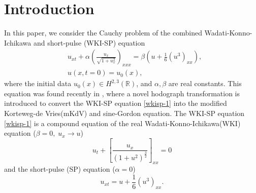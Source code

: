\documentclass[11pt]{article}
\numberwithin{equation}{section}
\begin{document}
\tableofcontents

\section{Introduction}
In this paper, we  consider  the Cauchy problem of the combined Wadati-Konno-Ichikawa and short-pulse (WKI-SP) equation
\begin{align}
    &u_{xt}+\alpha\left(\frac{u_x}{\sqrt{1+u_x^2}}\right)_{xxx}=\beta\left(u+\frac{1}{6}(u^3)_{xx}\right),\label{wkisp-1}\\
    &u(x,t=0)=u_0(x),\label{wkisp-2}
\end{align}
where the initial data $u_0(x)\in H^{2,3}(\mathbb{R})$, and $\alpha, \beta $ are real   constants.
This equation  was  found recently  in \cite{Hu-2024}, where  a novel hodograph transformation is introduced  to convert the   WKI-SP equation  \eqref{wkisp-1} into the modified Korteweg-de Vries(mKdV) and sine-Gordon equation. The WKI-SP equation   \eqref{wkisp-1}  is a compound equation of the real  Wadati-Konno-Ichikawa(WKI) equation ($\beta=0,\;u_x\to u$)
\begin{equation}
    u_t+\left[\frac{u_x}{(1+u^2)^{\frac{3}{2}}}\right]_{xx}=0\label{wki}
\end{equation}
and the short-pulse (SP) equation ($\alpha=0$)
\begin{equation}
    u_{xt}=u+\frac{1}{6}\left(u^3\right)_{xx}.\label{sp}
\end{equation}
\end{document}
